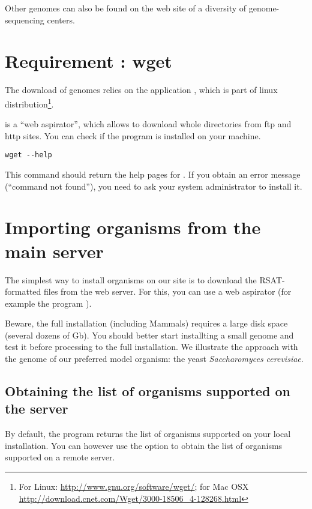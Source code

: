 Other genomes can also be found on the web site of a diversity of
genome-sequencing centers.

\section{Requirement : wget}

The download of genomes relies on the application ,
which is part of linux distribution\footnote{For Linux:
  \url{http://www.gnu.org/software/wget/}; for Mac OSX
  \url{http://download.cnet.com/Wget/3000-18506_4-128268.html}}.


 is a ``web aspirator'', which allows to download whole
directories from ftp and http sites. You can check if the program is
installed on your machine.

\begin{lstlisting}
wget --help
\end{lstlisting}


This command should return the help pages for .  If you
obtain an error message (``command not found''), you need to ask your
system administrator to install it.

\section{Importing organisms from the \RSAT main server}

The simplest way to install organisms on our \RSAT site is to download
the RSAT-formatted files from the web server. For this, you can use a
web aspirator (for example the program ). 

Beware, the full installation (including Mammals) requires a large
disk space (several dozens of Gb). You should better start installting
a small genome and test it before processing to the full
installation. We illustrate the approach with the genome of our
preferred model organism: the yeast \textit{Saccharomyces cerevisiae}.

\subsection{Obtaining the list of organisms supported on the \RSAT server}

By default, the program  returns the list
of organisms supported on your local \RSAT installation. You can
however use the option  to obtain the list of
organisms supported on a remote server.



